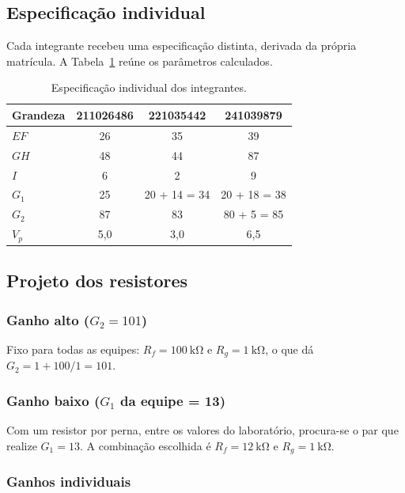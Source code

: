 \documentclass[11pt,a4paper]{article}
\begin{document}
\subsection{Especificação individual}

Cada integrante recebeu uma especificação distinta, derivada da própria matrícula. A Tabela~\ref{tab:individuais_r3} reúne os parâmetros calculados.

\begin{table}[h]
\centering
\caption{Especificação individual dos integrantes.}
\label{tab:individuais_r3}
\begin{tabular}{lccc}
\hline
Grandeza & 211026486 & 221035442 & 241039879 \\
\hline
$EF$ & 26 & 35 & 39 \\
$GH$ & 48 & 44 & 87 \\
$I$ & 6 & 2 & 9 \\
$G_1$ & 25 & 20 + 14 = 34 & 20 + 18 = 38 \\
$G_2$ & 87 & 83 & 80 + 5 = 85 \\
$V_p$ & 5,0 & 3,0 & 6,5 \\
\hline
\end{tabular}
\end{table}

\subsection{Projeto dos resistores}

\subsubsection{Ganho alto ($G_2 = 101$)}

Fixo para todas as equipes: $R_f = \SI{100}{\kilo\ohm}$ e $R_g = \SI{1}{\kilo\ohm}$, o que dá $G_2 = 1 + 100/1 = 101$.

\subsubsection{Ganho baixo ($G_1$ da equipe = 13)}

Com um resistor por perna, entre os valores do laboratório, procura-se o par que realize $G_1 = 13$. A combinação escolhida é $R_f = \SI{12}{\kilo\ohm}$ e $R_g = \SI{1}{\kilo\ohm}$.


\subsubsection{Ganhos individuais}
\end{document}
